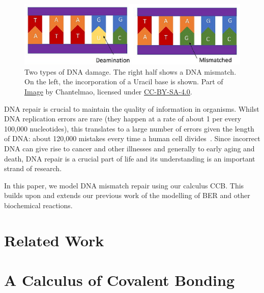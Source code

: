\documentclass[review]{elsarticle}
\begin{document}
\begin{figure}[h!]
  \centering
    \includegraphics[width=1.0\textwidth]{Types_of_DNA_Damage_part}
  \caption[Two types of DNA damage.]{Two types of DNA damage. The right half shows a DNA mismatch.
  On the left, the incorporation of a Uracil base is shown.
  Part of \href{https://commons.wikimedia.org/wiki/File:Types_of_DNA_Damage.jpg}{Image} by Chantelmao, licensed under \href{https://creativecommons.org/licenses/by-sa/4.0/deed.en}{CC-BY-SA-4.0}.}
  \label{fig:damages}
\end{figure}

DNA repair is crucial to maintain the quality of information in organisms. Whilst DNA replication errors are rare (they happen at a rate of about 1 per every 100,000 nucleotides), this translates to a large number of errors given the length of DNA: about 120,000 mistakes every time a human cell divides~\cite{damage}. Since incorrect DNA can give rise to cancer and other illnesses and generally to early aging and death, DNA repair is a crucial part of life and its understanding is an important strand of research.

In this paper, we model DNA mismatch repair using our calculus CCB. This builds upon and extends our previous work of the modelling of BER and other biochemical reactions.

\section{Related Work}

%
\section{A Calculus of Covalent Bonding}\label{sec:calculus}

%
%
%
\end{document}
